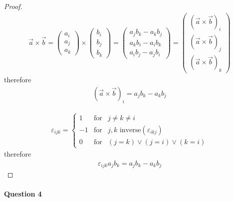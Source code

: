 \documentclass[11pt,a4paper]{article}
\begin{document}
\begin{enumerate}
\begin{proof}

\begin{align}
\vec{a}\times\vec{b}=
\begin{pmatrix}
a_i \\
a_j \\
a_k
\end{pmatrix}
\times
\begin{pmatrix}
b_i \\
b_j \\
b_k
\end{pmatrix}
=
\begin{pmatrix}
a_jb_k-a_kb_j \\
a_kb_i-a_ib_k \\
a_ib_j-a_jb_i
\end{pmatrix}
=
\begin{pmatrix}
(\vec{a}\times\vec{b})_i \\
(\vec{a}\times\vec{b})_j \\
(\vec{a}\times\vec{b})_k
\end{pmatrix}
\end{align}
therefore
\begin{align}
(\vec{a}\times\vec{b})_i=a_jb_k-a_kb_j
\end{align}

\begin{align}
\varepsilon_{ijk}=
\left\{
\begin{array}{lcl}
1 & \mbox{for} & j\neq k\neq i \\
-1 & \mbox{for} & j,k\mbox{ inverse}(\varepsilon_{ikj}) \\
0 & \mbox{for} & (j=k)\vee (j=i) \vee (k=i)
\end{array}
\right.
\end{align}
therefore
\begin{align*}
\varepsilon_{ijk}a_jb_k=a_jb_k-a_kb_j
\end{align*}

\end{proof}

\end{enumerate}

\newpage

\paragraph{Question 4}
\end{document}
